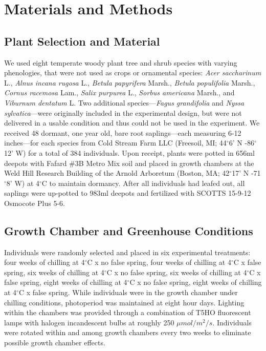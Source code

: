 \documentclass{article}\usepackage[]{graphicx}\usepackage[]{color}
\begin{document}
\section*{Materials and Methods}
\subsection*{Plant Selection and Material}
We used eight temperate woody plant tree and shrub species with varying phenologies, that were not used as crops or ornamental species: \textit{Acer saccharinum} L., \textit{Alnus incana rugosa} L., \textit{Betula papyrifera} Marsh., \textit{Betula populifolia} Marsh., \textit{Cornus racemosa} Lam., \textit{Salix purpurea} L., \textit{Sorbus americana} Marsh., and \textit{Viburnum dentatum} L. Two additional species---\textit{Fagus grandifolia} and \textit{Nyssa sylvatica}---were originally included in the experimental design, but were not delivered in a usable condition and thus could not be used in the experiment. We received 48 dormant, one year old, bare root saplings---each measuring 6-12 inches---for each species from Cold Stream Farm LLC (Freesoil, MI; 44$^{\circ}$6' N -86$^{\circ}$12' W) for a total of 384 individuals. Upon receipt, plants were potted in 656ml deepots with Fafard \#3B Metro Mix soil and placed in growth chambers at the Weld Hill Research Building of the Arnold Arboretum (Boston, MA; 42$^{\circ}$17' N -71$^{\circ}$8' W) at 4$^{\circ}$C to maintain dormancy. After all individuals had leafed out, all saplings were up-potted to 983ml deepots and fertilized with SCOTTS 15-9-12 Osmocote Plus 5-6.

\subsection*{Growth Chamber and Greenhouse Conditions}
Individuals were randomly selected and placed in six experimental treatments: four weeks of chilling at 4$^{\circ}$C x no false spring, four weeks of chilling at 4$^{\circ}$C x false spring, six weeks of chilling at 4$^{\circ}$C x no false spring, six weeks of chilling at 4$^{\circ}$C x false spring, eight weeks of chilling at 4$^{\circ}$C x no false spring, eight weeks of chilling at 4$^{\circ}$C x false spring. While individuals were in the growth chamber under chilling conditions, photoperiod was maintained at eight hour days. Lighting within the chambers was provided through a combination of T5HO fluorescent lamps with halogen incandescent bulbs at roughly 250 $\mu mol/m^{2}/s$. Individuals were rotated within and among growth chambers every two weeks to eliminate possible growth chamber effects.
\end{document}
